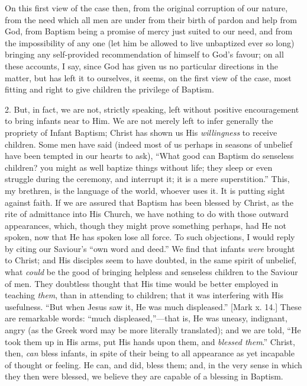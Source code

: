 On this first view of the case then, from the original
corruption of our nature, from the need which all men are
under from their birth of pardon and help from God, from
Baptism being a promise of mercy just suited to our need,
and from the impossibility of any one (let him be allowed
to live unbaptized ever so long) bringing any
self-provided recommendation of himself to God's favour;
on all these accounts, I say, since God has given us no
particular directions in the matter, but has left it to
ourselves, it seems, on the first view of the case, most
fitting and right to give children the privilege of
Baptism.

2. But, in fact, we are not, strictly speaking, left
without positive encouragement to bring infants near to
Him. We are not merely left to infer generally the
propriety of Infant Baptism; Christ has shown us His \emph{willingness}
to receive children. Some men have said (indeed most of
us perhaps in seasons of unbelief have been tempted in
our hearts to ask), ``What good can Baptism do
senseless children? you might as well baptize things
without life; they sleep or even struggle during the
ceremony, and interrupt it; it is a mere
superstition.'' This, my brethren, is the language of
the world, whoever uses it. It is putting sight against
faith. If we are assured that Baptism has been blessed by
Christ, as the rite of admittance into His Church, we have nothing to do with those outward appearances, which,
though they might prove something perhaps, had He not
spoken, now that He has spoken lose all force. To such
objections, I would reply by citing our Saviour's
``own word and deed.'' We find that infants \emph{were}
brought to Christ; and His disciples seem to have
doubted, in the same spirit of unbelief, what \emph{could}
be the good of bringing helpless and senseless children
to the Saviour of men. They doubtless thought that His
time would be better employed in teaching \emph{them},
than in attending to children; that it was interfering
with His usefulness. ``But when Jesus saw it, He was
much displeased.'' [Mark x. 14.] These are
remarkable words: ``much displeased,''—that
is, He was uneasy, indignant, angry (as the Greek word
may be more literally translated); and we are told,
``He took them up in His arms, put His hands upon
them, and \emph{blessed them}.'' Christ, then, \emph{can}
bless infants, in spite of their being to all appearance
as yet incapable of thought or feeling. He can, and did,
bless them; and, in the very sense in which they then
were blessed, we believe they are capable of a blessing
in Baptism.

